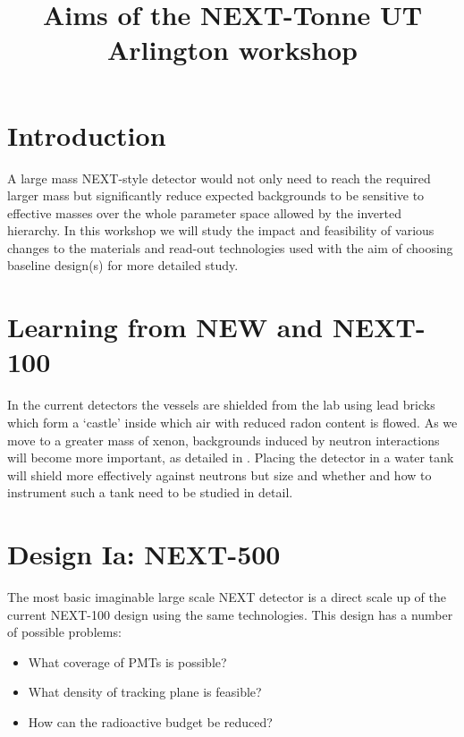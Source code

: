 \documentclass[11pt,a4paper]{article}
\begin{document}
\title{Aims of the NEXT-Tonne UT Arlington workshop}

\maketitle



\section{Introduction}
A large mass NEXT-style detector would not only need to reach the required larger mass but significantly reduce expected backgrounds to be sensitive to effective masses over the whole parameter space allowed by the inverted hierarchy. In this workshop we will study the impact and feasibility of various changes to the materials and read-out technologies used with the aim of choosing baseline design(s) for more detailed study.

\section{Learning from NEW and NEXT-100}
In the current detectors the vessels are shielded from the lab using lead bricks which form a `castle' inside which air with reduced radon content is flowed. As we move to a greater mass of xenon, backgrounds induced by neutron interactions will become more important, as detailed in \cite{munozth:2018}. Placing the detector in a water tank will shield more effectively against neutrons but size and whether and how to instrument such a tank need to be studied in detail.

\section{Design Ia: NEXT-500}
The most basic imaginable large scale NEXT detector is a direct scale up of the current NEXT-100 design using the same technologies. This design has a number of possible problems:
\begin{itemize}
\item What coverage of PMTs is possible?
\item What density of tracking plane is feasible?
\item How can the radioactive budget be reduced?
\end{itemize}
\end{document}
